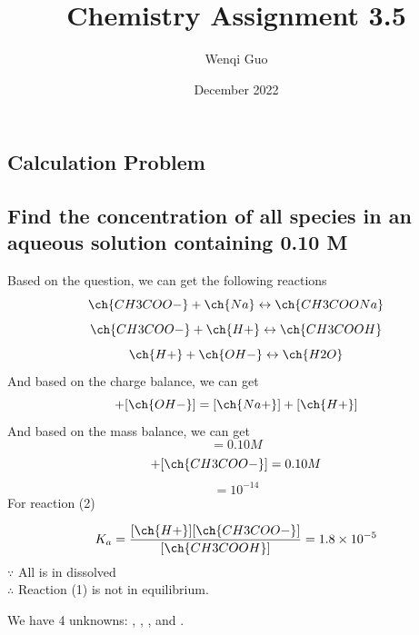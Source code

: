 \documentclass{article}
\title{Chemistry Assignment 3.5}
\author{Wenqi Guo}
\date{December 2022}
\begin{document}
\maketitle
\newcommand{\tab}{\;\;\;\;\;}
\begin{large}


\section{Calculation Problem}
\subsection{Find the concentration of all species in an aqueous solution containing 0.10 M }
Based on the question, we can get the following reactions
\begin{equation}
\ch{CH3COO-} + \ch{Na} \leftrightarrow \ch{CH3COONa}
\end{equation}
\begin{equation}
\ch{CH3COO-} + \ch{H+} \leftrightarrow \ch{CH3COOH}
\end{equation}
\begin{equation}
\ch{H+} + \ch{OH-} \leftrightarrow \ch{H2O}
\end{equation}
And based on the charge balance, we can get
\begin{equation}
[\ch{CH3COO-}] + [\ch{OH-}] = [\ch{Na+}] + [\ch{H+}]
\end{equation}
And based on the mass balance, we can get
\begin{equation}
[\ch{Na+}] = 0.10M
\end{equation}
\begin{equation}
[\ch{CH3COOH}] + [\ch{CH3COO-}] = 0.10M
\end{equation}
\begin{equation}
[\ch{H+}][\ch{OH-}]=10^{-14}
\end{equation}
For reaction (2)

\begin{equation}
K_a = \frac{[\ch{H+}][\ch{CH3COO-}]}{[\ch{CH3COOH}]}  = 1.8 \times 10^{-5}
\end{equation}
$\because$ All  is in dissolved\\$\therefore$ Reaction (1) is not in equilibrium.

We have 4 unknowns: , , , and . 


\end{large}
\end{document}
